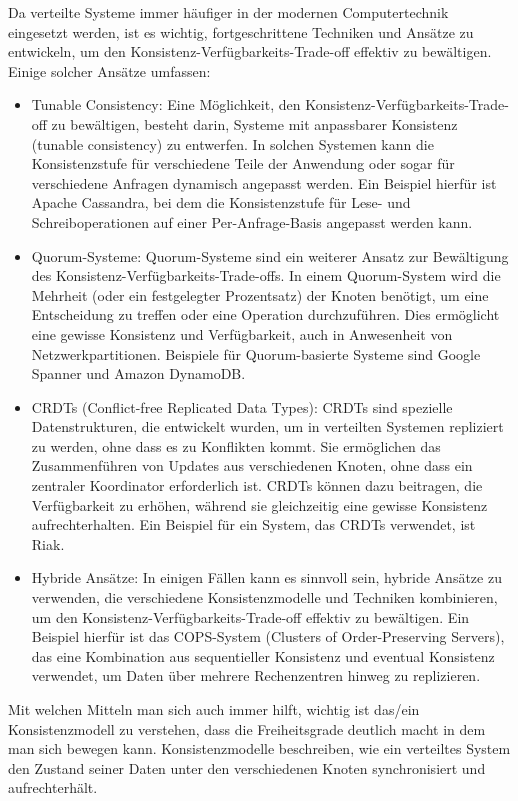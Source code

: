 Da verteilte Systeme immer häufiger in der modernen Computertechnik eingesetzt werden, ist es wichtig, fortgeschrittene Techniken und Ansätze zu entwickeln, um den Konsistenz-Verfügbarkeits-Trade-off effektiv zu bewältigen. Einige solcher Ansätze umfassen:
\begin{itemize}
\item Tunable Consistency: Eine Möglichkeit, den Konsistenz-Verfügbarkeits-Trade-off zu bewältigen, besteht darin, Systeme mit anpassbarer Konsistenz (tunable consistency) zu entwerfen. In solchen Systemen kann die Konsistenzstufe für verschiedene Teile der Anwendung oder sogar für verschiedene Anfragen dynamisch angepasst werden. Ein Beispiel hierfür ist Apache Cassandra, bei dem die Konsistenzstufe für Lese- und Schreiboperationen auf einer Per-Anfrage-Basis angepasst werden kann.
\item Quorum-Systeme: Quorum-Systeme sind ein weiterer Ansatz zur Bewältigung des Konsistenz-Verfügbarkeits-Trade-offs. In einem Quorum-System wird die Mehrheit (oder ein festgelegter Prozentsatz) der Knoten benötigt, um eine Entscheidung zu treffen oder eine Operation durchzuführen. Dies ermöglicht eine gewisse Konsistenz und Verfügbarkeit, auch in Anwesenheit von Netzwerkpartitionen. Beispiele für Quorum-basierte Systeme sind Google Spanner und Amazon DynamoDB.
\item CRDTs (Conflict-free Replicated Data Types): CRDTs sind spezielle Datenstrukturen, die entwickelt wurden, um in verteilten Systemen repliziert zu werden, ohne dass es zu Konflikten kommt. Sie ermöglichen das Zusammenführen von Updates aus verschiedenen Knoten, ohne dass ein zentraler Koordinator erforderlich ist. CRDTs können dazu beitragen, die Verfügbarkeit zu erhöhen, während sie gleichzeitig eine gewisse Konsistenz aufrechterhalten. Ein Beispiel für ein System, das CRDTs verwendet, ist Riak.
\item Hybride Ansätze: In einigen Fällen kann es sinnvoll sein, hybride Ansätze zu verwenden, die verschiedene Konsistenzmodelle und Techniken kombinieren, um den Konsistenz-Verfügbarkeits-Trade-off effektiv zu bewältigen. Ein Beispiel hierfür ist das COPS-System (Clusters of Order-Preserving Servers), das eine Kombination aus sequentieller Konsistenz und eventual Konsistenz verwendet, um Daten über mehrere Rechenzentren hinweg zu replizieren.
\end{itemize}
Mit welchen Mitteln man sich auch immer hilft, wichtig ist das/ein Konsistenzmodell zu verstehen, dass die Freiheitsgrade deutlich macht in dem man sich bewegen kann. Konsistenzmodelle beschreiben, wie ein verteiltes System den Zustand seiner Daten unter den verschiedenen Knoten synchronisiert und aufrechterhält. 
